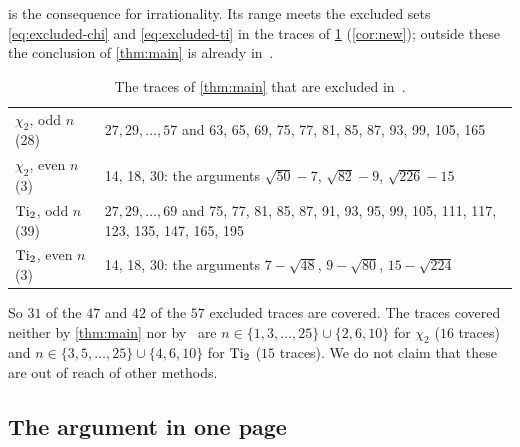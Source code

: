  is the consequence for irrationality. Its range meets the excluded sets
\eqref{eq:excluded-chi} and \eqref{eq:excluded-ti} in the traces of \cref{tab:new} (\cref{cor:new}); outside these
the conclusion of \cref{thm:main} is already in~\Kri.

\begin{table}[ht]
\centering\small\sloppy
\caption{The traces of \cref{thm:main} that are excluded in~\Kri.}\label{tab:new}
\begin{tabular}{@{}lp{}@{}}
\toprule
$\chi_2$, odd $n$ (28) & $27,29,\dots,57$ and 63, 65, 69, 75, 77, 81, 85, 87, 93, 99, 105, 165\\
$\chi_2$, even $n$ (3) & 14, 18, 30: the arguments $\sqrt{50}-7$, $\sqrt{82}-9$, $\sqrt{226}-15$\\
\midrule
$\operatorname{Ti}_2$, odd $n$ (39) & $27,29,\dots,69$ and 75, 77, 81, 85, 87, 91, 93, 95, 99, 105, 111, 117, 123, 135, 147, 165, 195\\
$\operatorname{Ti}_2$, even $n$ (3) & 14, 18, 30: the arguments $7-\sqrt{48}$, $9-\sqrt{80}$, $15-\sqrt{224}$\\
\bottomrule
\end{tabular}
\end{table}

So $31$ of the $47$ and $42$ of the $57$ excluded traces are covered. The traces covered neither
by \cref{thm:main} nor by~\Kri{} are $n\in\{1,3,\dots,25\}\cup\{2,6,10\}$ for $\chi_2$ ($16$
traces) and $n\in\{3,5,\dots,25\}\cup\{4,6,10\}$ for $\operatorname{Ti}_2$ ($15$ traces). We do not claim that
these are out of reach of other methods.

\subsection{The argument in one page}\label{subsec:one-page}


